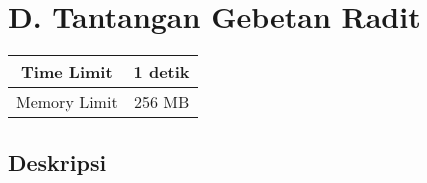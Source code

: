 \documentclass{article}
\begin{document}
\section*{\hfil D. Tantangan Gebetan Radit\hfil}

\begin{center}
\begin{tabular}{ |cc| } 
 \hline
 Time Limit & 1 detik \\ 
 \hline
 Memory Limit & 256 MB \\
 \hline
\end{tabular}
\end{center}

\subsection*{Deskripsi}
\end{document}
